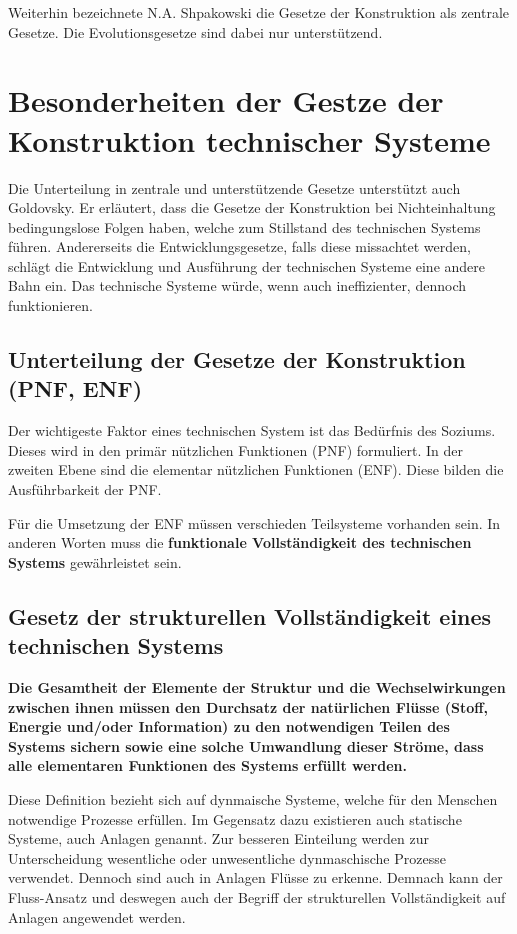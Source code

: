 \documentclass[DIV=22, 10pt, a4paper]{scrartcl}
\begin{document}
    Weiterhin bezeichnete N.A. Shpakowski die Gesetze der Konstruktion als zentrale Gesetze.
    Die Evolutionsgesetze sind dabei nur unterstützend.

    \section{Besonderheiten der Gestze der Konstruktion technischer Systeme}
    Die Unterteilung in zentrale und unterstützende Gesetze unterstützt auch Goldovsky. 
    Er erläutert, dass die Gesetze der Konstruktion bei Nichteinhaltung bedingungslose Folgen haben, welche zum Stillstand des technischen Systems führen.
    Andererseits die Entwicklungsgesetze, falls diese missachtet werden, schlägt die Entwicklung und Ausführung der technischen Systeme eine andere Bahn ein. 
    Das technische Systeme würde, wenn auch ineffizienter, dennoch funktionieren. 

    \subsection{Unterteilung der Gesetze der Konstruktion (PNF, ENF)}
    Der wichtigeste Faktor eines technischen System ist das Bedürfnis des Soziums. 
    Dieses wird in den primär nützlichen Funktionen (PNF) formuliert.
    In der zweiten Ebene sind die elementar nützlichen Funktionen (ENF).
    Diese bilden die Ausführbarkeit der PNF.

    Für die Umsetzung der ENF müssen verschieden Teilsysteme vorhanden sein. 
    In anderen Worten muss die \textbf{funktionale Vollständigkeit des technischen Systems} gewährleistet sein.

    \subsection{Gesetz der strukturellen Vollständigkeit eines technischen Systems}
    \begin{center}
        \textbf{Die Gesamtheit der Elemente der Struktur und die Wechselwirkungen zwischen ihnen müssen den Durchsatz der natürlichen Flüsse (Stoff,
        Energie und/oder Information) zu den notwendigen Teilen des Systems sichern
        sowie eine solche Umwandlung dieser Ströme, dass alle elementaren Funktionen
        des Systems erfüllt werden.}
    \end{center}

    Diese Definition bezieht sich auf dynmaische Systeme, welche für den Menschen notwendige Prozesse erfüllen.
    Im Gegensatz dazu existieren auch statische Systeme, auch Anlagen genannt.
    Zur besseren Einteilung werden zur Unterscheidung wesentliche oder unwesentliche dynmaschische Prozesse verwendet.
    Dennoch sind auch in Anlagen Flüsse zu erkenne.
    Demnach kann der Fluss-Ansatz und deswegen auch der Begriff der strukturellen Vollständigkeit auf Anlagen angewendet werden.
\end{document}
